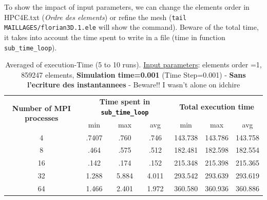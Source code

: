 \documentclass[10pt,twoside]{article}   	%
\begin{document}
To show the impact of input parameters, we can change the elements order in HPC4E.txt (\textit{Ordre des elements}) or refine the mesh (\texttt{tail MAILLAGES/florian3D.1.ele} will show the command). Beware of the total time, it takes into account the time spent to write in a file (time in function \texttt{sub\_time\_loop}).

\begin{table}[ht!]
\centering
\caption{Averaged of execution-Time (5 to 10 runs). {\underline{Input parameters}}: elements order =1, 859247 elements, {\bf{Simulation time=0.001}} (Time Step=0.001) - {\bf{Sans l'ecriture des instantannees}} - Beware!! I wasn't alone on idchire}
{\small
\begin{tabular}{|c|c|c|c|c|c|c|} \hline 
\multirow{2}{*}{ {{\bf{Number of MPI processes}}} }	& \multicolumn{3}{c|}{ {{\bf{Time spent in \texttt{sub\_time\_loop}  }}} }	& \multicolumn{3}{c|}{  {{\bf{Total execution time}}} }\\ 
										&  min 	& max	 & avg									& 	min & max & avg			\\ \hline \hline
 		4		                 				&  .7407	& .760 	& .746									&  	143.738 & 143.786	& 143.758 \\ \hline
 		8		                 				& .464	& .575  	& .512									&  	182.481 & 182.598 	& 182.554	\\ \hline		
 		16		                 				&  .142	& .174	 & .152									&  	215.348 & 215.398 	&  215.365\\ \hline
		 32		                 				& 1.288	&  5.884  & 4.011		  						        &  	293.542 &  293.639	& 293.619	\\ \hline
		64		                 				& 1.466	& 2.401 & 1.972									&  	360.580 & 360.936	& 360.886\\ \hline
\end{tabular}
}
\label{tab:1}
\end{table}
\end{document}
